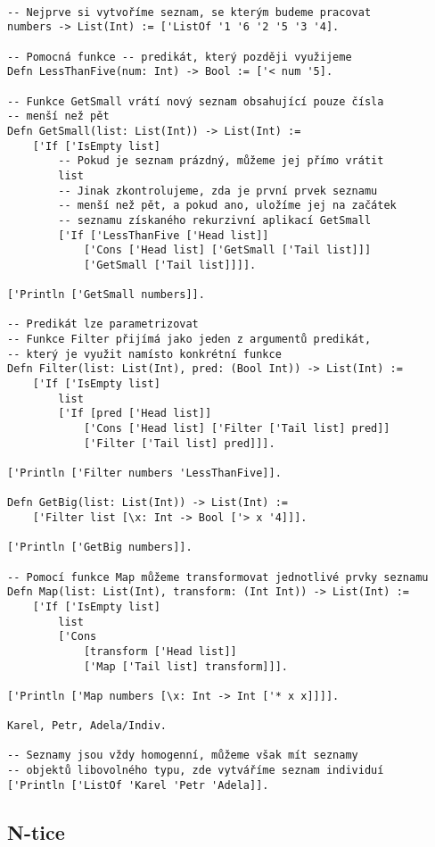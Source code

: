 \begin{lstlisting}[caption={Funkce a uzávěry}, language=Tilscript]

-- Nejprve si vytvoříme seznam, se kterým budeme pracovat
numbers -> List(Int) := ['ListOf '1 '6 '2 '5 '3 '4].

-- Pomocná funkce -- predikát, který později využijeme
Defn LessThanFive(num: Int) -> Bool := ['< num '5].

-- Funkce GetSmall vrátí nový seznam obsahující pouze čísla
-- menší než pět
Defn GetSmall(list: List(Int)) -> List(Int) :=
    ['If ['IsEmpty list]
        -- Pokud je seznam prázdný, můžeme jej přímo vrátit
        list
        -- Jinak zkontrolujeme, zda je první prvek seznamu
        -- menší než pět, a pokud ano, uložíme jej na začátek
        -- seznamu získaného rekurzivní aplikací GetSmall
        ['If ['LessThanFive ['Head list]]
            ['Cons ['Head list] ['GetSmall ['Tail list]]]
            ['GetSmall ['Tail list]]]].

['Println ['GetSmall numbers]].

-- Predikát lze parametrizovat
-- Funkce Filter přijímá jako jeden z argumentů predikát,
-- který je využit namísto konkrétní funkce
Defn Filter(list: List(Int), pred: (Bool Int)) -> List(Int) :=
    ['If ['IsEmpty list]
        list
        ['If [pred ['Head list]]
            ['Cons ['Head list] ['Filter ['Tail list] pred]]
            ['Filter ['Tail list] pred]]].

['Println ['Filter numbers 'LessThanFive]].

Defn GetBig(list: List(Int)) -> List(Int) :=
    ['Filter list [\x: Int -> Bool ['> x '4]]].

['Println ['GetBig numbers]].

-- Pomocí funkce Map můžeme transformovat jednotlivé prvky seznamu
Defn Map(list: List(Int), transform: (Int Int)) -> List(Int) :=
    ['If ['IsEmpty list]
        list
        ['Cons
            [transform ['Head list]]
            ['Map ['Tail list] transform]]].

['Println ['Map numbers [\x: Int -> Int ['* x x]]]].

Karel, Petr, Adela/Indiv.

-- Seznamy jsou vždy homogenní, můžeme však mít seznamy
-- objektů libovolného typu, zde vytváříme seznam individuí
['Println ['ListOf 'Karel 'Petr 'Adela]].
\end{lstlisting}

\subsection{N-tice}


